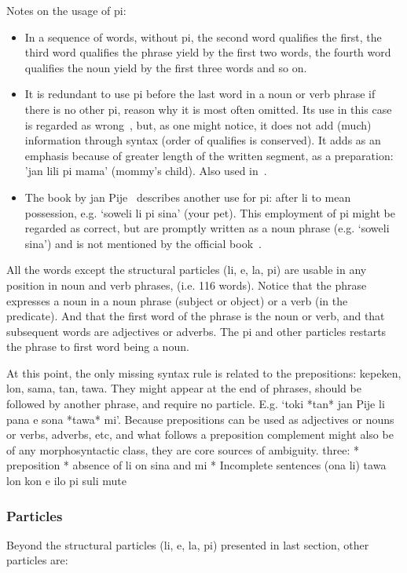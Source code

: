 \documentclass{article}
\begin{document}
Notes on the usage of pi:
\begin{itemize}
  \item In a sequence of words, without pi, the second word qualifies
    the first, the third word qualifies the phrase yield by the first
    two words, the fourth word qualifies the noun yield by the first
    three words and so on.
  \item It is redundant to use pi before the last word in a noun or
    verb phrase if there is no other pi, reason why it is most often
    omitted.
    Its use in this case is regarded as wrong~\cite{lipu,pije},
    but, as one might notice, it does not add (much) information
    through syntax (order of qualifies is conserved).
    It adds as an emphasis because of greater length of the written segment, as a preparation: 'jan lili pi mama' (mommy's child).
    Also used in~\cite{akesiWawa}.
  \item The book by jan Pije~\cite{kama} describes another use for pi:
    after li to mean possession, e.g. `soweli li pi sina' (your pet).
    This employment of pi might be regarded as correct, but are promptly written
    as a noun phrase (e.g. `soweli sina') and is not mentioned
    by the official book~\cite{tpLabg}.
\end{itemize}

All the words except the structural particles (li, e, la, pi)
are usable in any position in noun and verb phrases,
(i.e. 116 words).
Notice that the phrase expresses a noun in a noun phrase (subject or
object) or a verb (in the predicate).
And that the first word of the phrase is the noun or verb,
and that subsequent words are adjectives or adverbs.
The pi and other particles restarts the phrase to
first word being a noun.

At this point, the only missing syntax rule is related to
the prepositions: kepeken, lon, sama, tan, tawa.
They might appear at the end of phrases,
should be followed by another phrase,
and require no particle. E.g.
`toki *tan* jan Pije li pana e sona *tawa* mi'.
Because prepositions can be used as adjectives
or nouns or verbs, adverbs, etc, and what follows
a preposition complement might also be of any morphosyntactic class,
they are core sources of ambiguity.
three:
* preposition
* absence of li on sina and mi
* Incomplete sentences
(ona li) tawa lon kon e ilo pi suli mute

\subsubsection{Particles}
Beyond the structural particles (li, e, la, pi) presented
in last section, other particles are:
\end{document}

